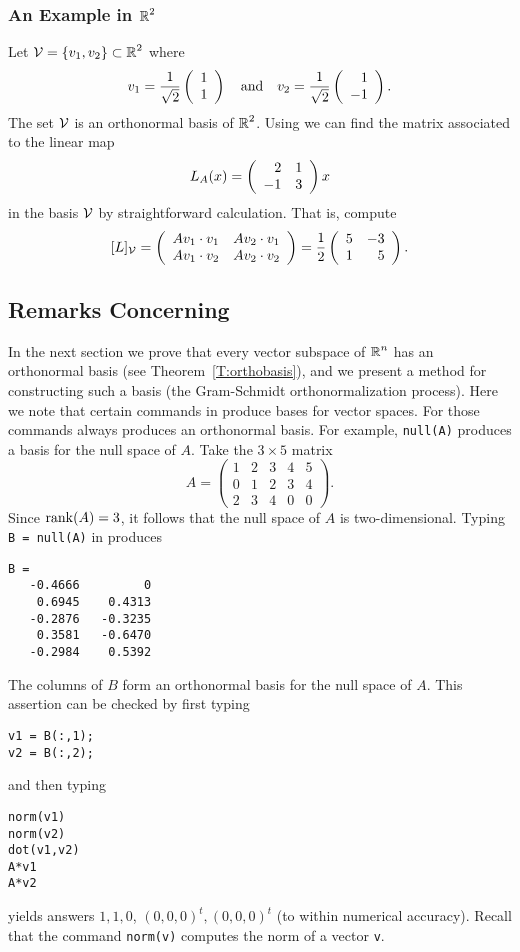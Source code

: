 \documentclass{ximera}
\begin{document}
\subsubsection{An Example in $\mbox{$\Bbb{R}$}^2$}

Let ${\cal V}=\{v_1,v_2\}\subset\mbox{$\Bbb{R}$}^2$ where
\[
v_1=\frac{1}{\sqrt{2}}\left(\begin{array}{r} 1 \\ 1\end{array}\right) \quad\mbox{and}\quad
v_2=\frac{1}{\sqrt{2}}\left(\begin{array}{r} 1 \\ -1\end{array}\right).
\]
The set ${\cal V}$ is an orthonormal basis of $\mbox{$\Bbb{R}$}^2$.  Using
 we can find the matrix associated to the linear map
\[
L_A(x) = \left(\begin{array}{rr} 2 & 1\\ -1 &3\end{array}\right)x
\]
in the basis ${\cal V}$ by straightforward calculation.  That is, compute
\[
[L]_{\cal V} =
\left(\begin{array}{rr} Av_1\cdot v_1 & Av_2\cdot v_1\\ Av_1\cdot v_2 &Av_2\cdot v_2\end{array}\right)
=\frac{1}{2}\left(\begin{array}{rr} 5 & -3\\ 1 &5\end{array}\right).
\]

\subsection*{Remarks Concerning \Matlab}

In the next section we prove that every vector subspace of $\mbox{$\Bbb{R}$}^n$ has an
orthonormal basis (see Theorem~\ref{T:orthobasis}), and we present a method
for constructing such a basis (the Gram-Schmidt orthonormalization process).
Here we note that certain commands in \Matlab produce bases for vector spaces.
For those commands \Matlab always produces an orthonormal basis.  For example,
{\tt null(A)} produces a basis for the null space
 of $A$.  Take the $3\times 5$ matrix
\begin{equation*}
\label{eq:Anull1}
A = \left(\begin{array}{rrrrr} 1 & 2 & 3 & 4 & 5\\ 0 & 1 & 2 & 3 & 4\\
2 & 3 & 4 & 0 & 0 \end{array}\right).
\end{equation*}
Since ${\rm rank}(A)=3$, it follows that the null space of $A$ is two-dimensional.
Typing {\tt B = null(A)} in \Matlab produces
\begin{verbatim}
B =
   -0.4666         0
    0.6945    0.4313
   -0.2876   -0.3235
    0.3581   -0.6470
   -0.2984    0.5392
\end{verbatim}
The columns of $B$ form an orthonormal basis for the null space of $A$.
This assertion can be checked by first typing
\begin{verbatim}
v1 = B(:,1);
v2 = B(:,2);
\end{verbatim}
and then typing
\begin{verbatim}
norm(v1)
norm(v2)
dot(v1,v2)
A*v1
A*v2
\end{verbatim}
yields answers $1,1,0$, $(0,0,0)^t,(0,0,0)^t$
(to within numerical accuracy).  Recall that the \Matlab
command {\tt norm(v)} computes the norm of a vector {\tt v}.
\end{document}
